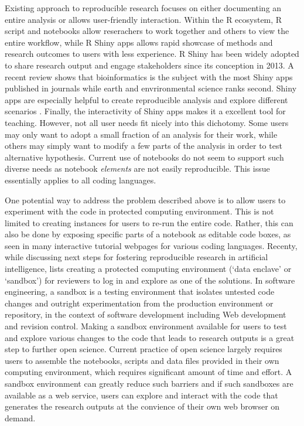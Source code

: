 Existing approach to reproducible research focuses on either documenting
an entire analysis or allows user-friendly interaction. Within the R
ecosystem, R script and notebooks allow reserachers to work together and
others to view the entire workflow, while R Shiny apps \citep{shiny}
allows rapid showcase of methods and research outcomes to users with
less experience. R Shiny has been widely adopted to share research
output and engage stakeholders since its conception in 2013. A recent
review \citep{Kasprzak} shows that bioinformatics is the subject with
the most Shiny apps published in journals while earth and envrironmental
science ranks second. Shiny apps are especially helpful to create
reproducible analysis \citep[e.g.~examples in][]{Hollaway2020} and
explore different scenarios \citep[e.g.][]{Whateley2015, Mose2018}.
Finally, the interactivity of Shiny apps makes it a excellent tool for
teaching\citep[e.g.][]{Williams2017, adventr}. However, not all user
needs fit nicely into this dichotomy. Some users may only want to adopt
a small fraction of an analysis for their work, while others may simply
want to modify a few parts of the analysis in order to test alternative
hypothesis. Current use of notebooks do not seem to support such diverse
needs as notebook \emph{elements} are not easily reproducible. This
issue essentially applies to all coding languages.

One potential way to address the problem described above is to allow
users to experiment with the code in protected computing environment.
This is not limited to creating instances for users to re-run the entire
code. Rather, this can also be done by exposing specific parts of a
notebook as editable code boxes, as seen in many interactive tutorial
webpages for various coding languages. Recenty, while discussing next
steps for fostering reproducible research in artificial intelligence,
\citet{Carter2019} lists creating a protected computing environment
(`data enclave' or `sandbox') for reviewers to log in and explore as one
of the solutions. In software engineering, a sandbox is a testing
environment that isolates untested code changes and outright
experimentation from the production environment or repository, in the
context of software development including Web development and revision
control. Making a sandbox environment available for users to test and
explore various changes to the code that leads to research outputs is a
great step to further open science. Current practice of open science
largely requires users to assemble the notebooks, scripts and data files
provided in their own computing environment, which requires significant
amount of time and effort. A sandbox environment can greatly reduce such
barriers and if such sandboxes are available as a web service, users can
explore and interact with the code that generates the research outputs
at the convience of their own web browser on demand.

